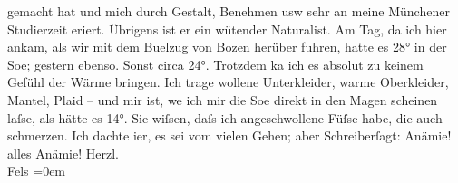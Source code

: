 \begin{ledgroupsized}[t]{13cm}
                    gemacht hat und mich durch Gestalt, Benehmen usw sehr an meine Münchener Studierzeit eri{\geminationn}ert. Übrigens ist er ein wütender Naturalist.\pend
           \pstart
           Am Tag, da ich hier ankam, als wir mit dem Bu{\geminationm}elzug
                    von Bozen herüber fuhren, hatte es 28° in der
                        So{\geminationn}e; gestern ebenso. Sonst circa 24°. {\pb}Trotzdem ka{\geminationn} ich es
                    absolut zu keinem Gefühl der Wärme bringen. Ich trage wollene Unterkleider,
                    warme Oberkleider, Mantel, Plaid – und mir ist, we{\geminationn}
                    ich mir die So{\geminationn}e direkt in den Magen scheinen
                    laſse, als hätte es 14°.\pend
           \pstart
           Sie wiſsen, daſs ich angeschwollene Füſse habe, die auch schmerzen. Ich dachte
                        i{\geminationm}er, es sei vom vielen Gehen; aber Schreiberſagt: Anämie! alles Anämie!\pend
           \pstart
           Herzl. {\\[\baselineskip]}\spacefill\mbox{Fels}\pend
           \leftskip=0em{}\endnumbering{}\end{ledgroupsized}  \newcommand{\dateiname}{L00177}\newcommand{\titel}{Friedrich M. Fels an Arthur Schnitzler, 1[7]. 2. 1893}\newcommand{\editorInnen}{Martin Anton Müller und Gerd-Hermann Susen}
      
